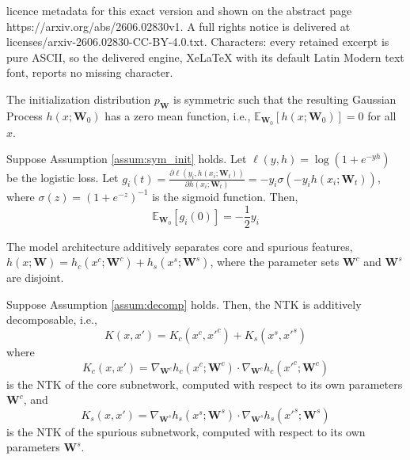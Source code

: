 \documentclass[10pt,a4paper]{amsart}
\begin{document}
licence metadata for this exact version and shown on the abstract page https://arxiv.org/abs/2606.02830v1. A full rights notice is delivered at licenses/arxiv-2606.02830-CC-BY-4.0.txt. Characters: every retained excerpt is pure ASCII, so the delivered engine, XeLaTeX with its default Latin Modern text font, reports no missing character.
\begin{assumption}\label{assum:sym_init}
    The initialization distribution $p_\mathbf{W}$ is symmetric such that the resulting Gaussian Process $h(x; \mathbf{W}_0)$ has a zero mean function, i.e., $\mathbb{E}_{\mathbf{W}_0}[h(x; \mathbf{W}_0)] = 0$ for all $x$.
\end{assumption}

\begin{proposition}\label{prop:init_grad}
    Suppose Assumption \ref{assum:sym_init} holds. Let $\ell(y, h) = \log(1 + e^{-y h})$ be the logistic loss. Let $g_i(t) = \frac{\partial \ell(y_i, h(x_i; \mathbf{W}_t))}{\partial h(x_i; \mathbf{W}_t)} = -y_i \sigma(-y_i h(x_i; \mathbf{W}_t))$, where $\sigma(z) = (1 + e^{-z})^{-1}$ is the sigmoid function. Then,
\begin{equation}
    \mathbb{E}_{\mathbf{W}_0}[g_i(0)] = -\frac{1}{2} y_i
\end{equation}
\end{proposition}

\begin{assumption}\label{assum:decomp}
    The model architecture additively separates core and spurious features, $h(x; \mathbf{W}) = h_c(x^c; \mathbf{W}^c) + h_s(x^s; \mathbf{W}^s)$, where the parameter sets $\mathbf{W}^c$ and $\mathbf{W}^s$ are disjoint. 
\end{assumption}

\begin{proposition}\label{prop:decomp_kernel}
    Suppose Assumption \ref{assum:decomp} holds. Then, the NTK is additively decomposable, i.e., 
    \begin{equation}
        K(x, x') = K_c(x^c, x'^c) + K_s(x^s, x'^s)
    \end{equation}
     where 
     \begin{equation}
         K_c(x, x') = \nabla_{\mathbf{W}^c} h_c(x^c; \mathbf{W}^c) \cdot \nabla_{\mathbf{W}^c} h_c(x'^c; \mathbf{W}^c)
     \end{equation}
     is the NTK of the core subnetwork, computed with respect to its own parameters $\mathbf{W}^c$,
and  
\begin{equation}
    K_s(x, x') = \nabla_{\mathbf{W}^s} h_s(x^s; \mathbf{W}^s) \cdot \nabla_{\mathbf{W}^s} h_s(x'^s; \mathbf{W}^s)
\end{equation}
is the NTK of the spurious subnetwork, computed with respect to its own parameters $\mathbf{W}^s$.
\end{proposition}
\end{document}
